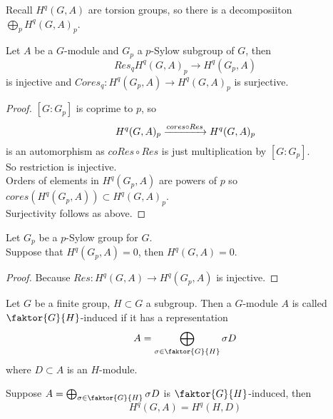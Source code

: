 \documentclass[../main.tex]{subfiles}
\begin{document}
Recall $H^{q}( G,A) $ are torsion groups, so there is a decomposiiton $\bigoplus_p H^{q}( G,A)_p$.
\begin{thm}
Let $A$ be a $G$-module and $G_p$ a $p$-Sylow subgroup of $G$, then 
\[ 
Res_q H^{q}( G,A)_p \to H^{q}( G_p,A) 
\]
is injective and $Cores_q:H^{q}( G_p,A) \to H^{q}( G,A)_p$ is surjective.
\end{thm}
\begin{proof}
	$[G:G_p]$ is coprime to $p$, so 
	\[ 
		H^{q}( G,A) _p \xrightarrow{cores\circ Res} H^{q}( G,A)_p
	\]
	is an automorphism as $coRes\circ Res$ is just multiplication by $[G:G_p]$.\\
	So restriction is injective.\\
	Orders of elements in $H^{q}( G_p,A) $ are powers of $p$ so $cores( H^{q}( G_p,A) ) \subset H^{q}( G,A) _p$.\\
	Surjectivity follows as above.
\end{proof}
\begin{crly}
Let $G_p$ be a $p$-Sylow group for $G$.\\
Suppose that $H^{q}( G_p,A) =0$, then $H^{q}( G,A) =0$.
\end{crly}
\begin{proof}
Because $Res: H^{q}( G,A) \to H^{q}( G_p,A) $ is injective.
\end{proof}
\begin{defn}
	Let $G$ be a finite group, $H \subset G$ a subgroup. Then a $G$-module $A$ is called $ \faktor{G}{H}$-induced if it has a representation
	\[ 
	A= \bigoplus_{\sigma \in \faktor{G}{H}} \sigma D 
	\]
	where $D \subset A$ is an $H$-module.
\end{defn}
\begin{thm}
	Suppose $A= \bigoplus_{\sigma \in \faktor{G}{H}} \sigma D $ is $ \faktor{G}{H}$-induced, then
	\[ 
	H^{q}( G,A) = H^{q}( H,D) 
	\]
\end{thm}
\end{document}
